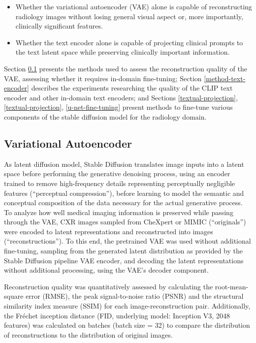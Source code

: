 \documentclass{article}
\begin{document}
\begin{itemize}
    \item Whether the variational autoencoder (VAE) alone is capable of reconstructing radiology images without losing general visual aspect or, more importantly, clinically significant features.
    \item Whether the text encoder alone is capable of projecting clinical prompts to the text latent space while preserving clinically important information.
\end{itemize}

Section \ref{variational-autoencoder} presents the methods used to assess the reconstruction quality of the VAE, assessing whether it requires in-domain fine-tuning; Section \ref{method-text-encoder} describes the experiments researching the quality of the CLIP text encoder and other in-domain text encoders; and Sections \ref{textual-projection}, \ref{textual-projection}, \ref{u-net-fine-tuning} present methods to fine-tune various components of the stable diffusion model for the radiology domain.

\subsection{Variational Autoencoder}
\label{variational-autoencoder}

As latent diffusion model, Stable Diffusion translates image inputs into a latent space before performing the generative denoising process, using an encoder trained to remove high-frequency details representing perceptually negligible features (“perceptual compression”)\citep{Rombach2022}, before learning to model the semantic and conceptual composition of the data necessary for the actual generative process. To analyze how well medical imaging information is preserved while passing through the VAE, CXR images sampled from CheXpert or MIMIC (“originals”) were encoded to latent representations and reconstructed into images (“reconstructions”). To this end, the pretrained VAE was used without additional fine-tuning, sampling from the generated latent distribution as provided by the Stable Diffusion pipeline VAE encoder, and decoding the latent representations without additional processing, using the VAE's decoder component.

Reconstruction quality was quantitatively assessed by calculating the root-mean-square error (RMSE), the peak signal-to-noise ratio (PSNR) and the structural similarity index measure (SSIM) for each image-reconstruction pair. Additionally, the Fréchet inception distance (FID, underlying model: Inception V3, 2048 features) was calculated on batches (batch size = 32) to compare the distribution of reconstructions to the distribution of original images\citep{szegedy2015, heusel2017}.
\end{document}
